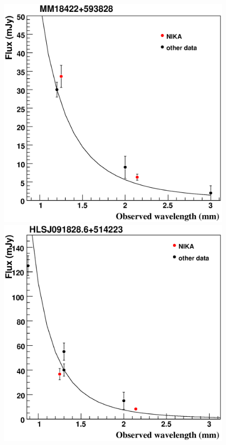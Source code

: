 \begin{figure}[t]
\begin{center}
\includegraphics[scale=0.35,angle=0]{figures/plotSEDMM18422.eps}
\includegraphics[scale=0.35,angle=0]{figures/plotSEDHLS0.eps}

\end{center}
\end{figure}

